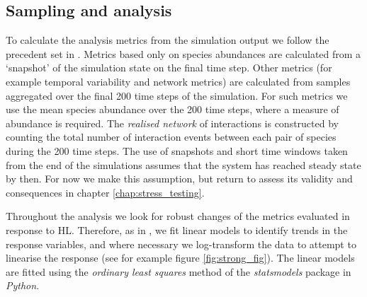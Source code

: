 \subsection{Sampling and analysis}
\label{sec:sampling}

To calculate the analysis metrics from the simulation output we follow the precedent set in \cite{lurgi2015effects}. Metrics based only on species abundances are calculated from a `snapshot' of the simulation state on the final time step. Other metrics (for example temporal variability and network metrics) are calculated from samples aggregated over the final 200 time steps of the simulation. For such metrics we use the mean species abundance over the 200 time steps, where a measure of abundance is required. The \emph{realised network} of interactions is constructed by counting the total number of interaction events between each pair of species during the 200 time steps. The use of snapshots and short time windows taken from the end of the simulations assumes that the system has reached steady state by then. For now we make this assumption, but return to assess its validity and consequences in chapter \ref{chap:stress_testing}.

Throughout the analysis we look for robust changes of the metrics evaluated in response to HL. Therefore, as in \cite{lurgi2015effects}, we fit linear models to identify  trends in the response variables, and where necessary we log-transform the data to attempt to linearise the response (see for example figure \ref{fig:strong_fig}). The linear models are fitted using the \emph{ordinary least squares} method of the \emph{statsmodels} package in \emph{Python}.  

